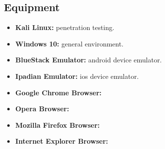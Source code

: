 \subsection{Equipment}

\begin{itemize}
	\item \textbf{Kali Linux:} penetration testing.
	\item \textbf{Windows 10:} general environment. 
	\item \textbf{BlueStack Emulator:} android device emulator.
	\item \textbf{Ipadian Emulator:} ios device emulator.
	\item \textbf{Google Chrome Browser:}
	\item \textbf{Opera Browser:}
	\item \textbf{Mozilla Firefox Browser:}
	\item \textbf{Internet Explorer Browser:}
\end{itemize}
